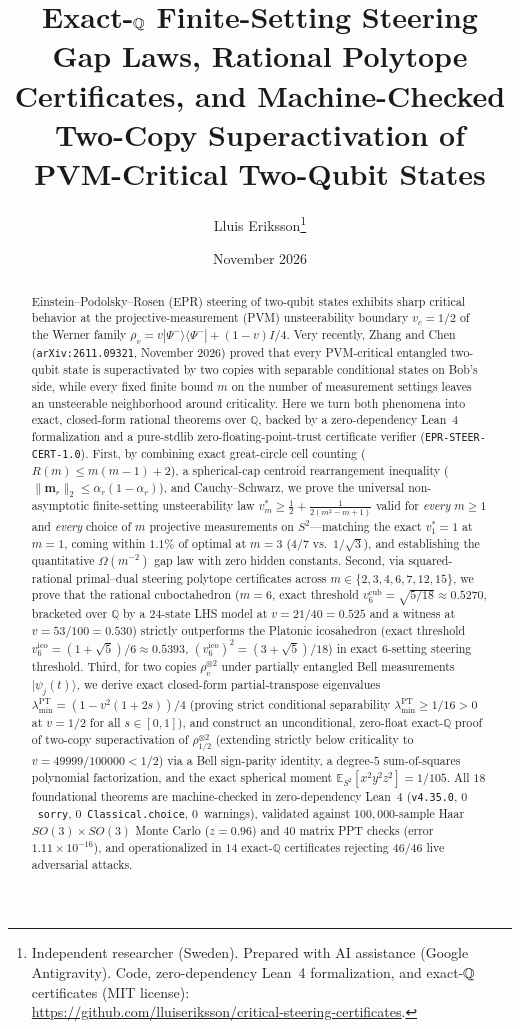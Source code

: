 \documentclass[11pt,a4paper]{article}
\title{\bfseries Exact-$\QQ$ Finite-Setting Steering Gap Laws, Rational Polytope Certificates, and Machine-Checked Two-Copy Superactivation of PVM-Critical Two-Qubit States}
\author{Lluis Eriksson\thanks{Independent researcher (Sweden). Prepared with AI assistance (Google Antigravity). Code, zero-dependency Lean~4 formalization, and exact-$\QQ$ certificates (MIT license):\\ \url{https://github.com/lluiseriksson/critical-steering-certificates}.}}
\date{November 2026}
\theoremstyle{definition}
\theoremstyle{remark}
\newcommand{\QQ}{\mathbb{Q}}
\newcommand{\certschema}{\texttt{EPR-STEER-CERT-1.0}}
\begin{document}
\maketitle

\begin{abstract}
Einstein--Podolsky--Rosen (EPR) steering of two-qubit states exhibits sharp critical behavior at the projective-measurement (PVM) unsteerability boundary $v_c = 1/2$ of the Werner family $\rho_v = v|\Psi^-\rangle\langle\Psi^-| + (1-v)I/4$. Very recently, Zhang and Chen (\texttt{arXiv:2611.09321}, November 2026) proved that every PVM-critical entangled two-qubit state is superactivated by two copies with separable conditional states on Bob's side, while every fixed finite bound $m$ on the number of measurement settings leaves an unsteerable neighborhood around criticality. Here we turn both phenomena into exact, closed-form rational theorems over $\QQ$, backed by a zero-dependency Lean~4 formalization and a pure-stdlib zero-floating-point-trust certificate verifier (\certschema{}). First, by combining exact great-circle cell counting ($R(m) \le m(m-1) + 2$), a spherical-cap centroid rearrangement inequality ($\|\mathbf{m}_r\|_2 \le \alpha_r(1-\alpha_r)$), and Cauchy--Schwarz, we prove the universal non-asymptotic finite-setting unsteerability law $v_m^* \ge \frac{1}{2} + \frac{1}{2(m^2 - m + 1)}$ valid for \emph{every} $m \ge 1$ and \emph{every} choice of $m$ projective measurements on $S^2$---matching the exact $v_1^* = 1$ at $m=1$, coming within $1.1\%$ of optimal at $m=3$ ($4/7$ vs.\ $1/\sqrt{3}$), and establishing the quantitative $\Omega(m^{-2})$ gap law with zero hidden constants. Second, via squared-rational primal--dual steering polytope certificates across $m \in \{2,3,4,6,7,12,15\}$, we prove that the rational cuboctahedron ($m=6$, exact threshold $v_6^{\mathrm{cub}} = \sqrt{5/18} \approx 0.5270$, bracketed over $\QQ$ by a $24$-state LHS model at $v=21/40=0.525$ and a witness at $v=53/100=0.530$) strictly outperforms the Platonic icosahedron (exact threshold $v_6^{\mathrm{ico}} = (1+\sqrt{5})/6 \approx 0.5393$, $(v_6^{\mathrm{ico}})^2 = (3+\sqrt{5})/18$) in exact $6$-setting steering threshold. Third, for two copies $\rho_v^{\otimes 2}$ under partially entangled Bell measurements $|\psi_j(t)\rangle$, we derive exact closed-form partial-transpose eigenvalues $\lambda_{\min}^{\mathrm{PT}} = (1 - v^2(1+2s))/4$ (proving strict conditional separability $\lambda_{\min}^{\mathrm{PT}} \ge 1/16 > 0$ at $v=1/2$ for all $s \in [0,1]$), and construct an unconditional, zero-float exact-$\QQ$ proof of two-copy superactivation of $\rho_{1/2}^{\otimes 2}$ (extending strictly below criticality to $v = 49999/100000 < 1/2$) via a Bell sign-parity identity, a degree-$5$ sum-of-squares polynomial factorization, and the exact spherical moment $\mathbb{E}_{S^2}[x^2 y^2 z^2] = 1/105$. All $18$ foundational theorems are machine-checked in zero-dependency Lean~4 (\texttt{v4.35.0}, $0$~\texttt{sorry}, $0$~\texttt{Classical.choice}, $0$~warnings), validated against $100{,}000$-sample Haar $SO(3)\times SO(3)$ Monte Carlo ($z = 0.96$) and $40$ matrix PPT checks (error $1.11\times 10^{-16}$), and operationalized in $14$ exact-$\QQ$ certificates rejecting $46/46$ live adversarial attacks.
\end{abstract}
\end{document}
